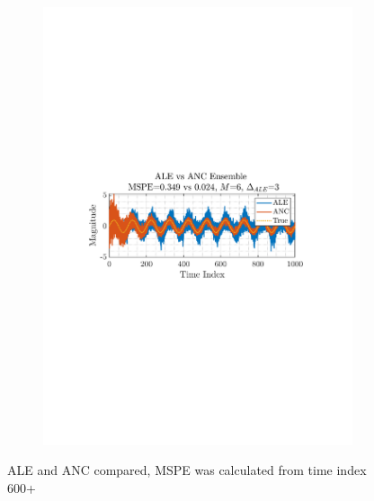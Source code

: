 \documentclass[12pt]{article}
\begin{document}
\begin{figure}[H]
\begin{subfigure}{0.49\textwidth}
					\includegraphics[trim={2.2cm 11.2cm 3.00cm  11.2cm}, clip, width=\textwidth]{../MATLAB/figures/q2_3c_fig02.pdf} 
					\captionsetup{justification=centering}
				\end{subfigure}
				\captionsetup{justification=centering}
				\caption{ALE and ANC compared, MSPE was calculated from time index 600+}
				\label{fig: 2-3c}
			\end{figure}
\end{document}
